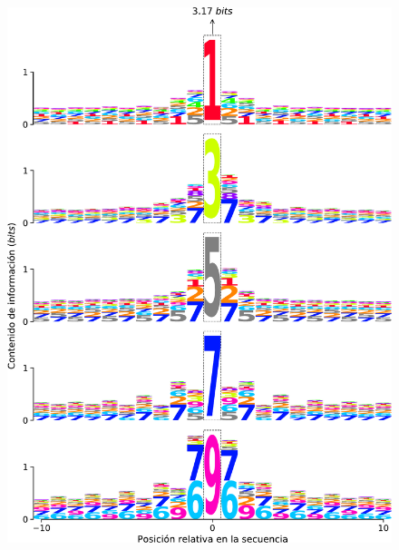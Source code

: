 \begin{landscape}
\begin{figure}[!htbp]
\begin{minipage}{0.5\linewidth}
    \centering
    \includegraphics[width=.9\linewidth]{figuras/expertos/logos/conditional_logos_odd.pdf}
\end{minipage}
\begin{minipage}{0.42\linewidth}
    \centering
    \vspace{-0.25em}

\end{minipage}
\end{figure}
\end{landscape}
